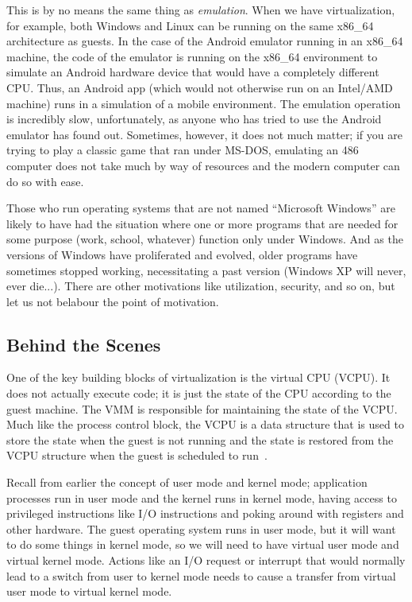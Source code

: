 This is by no means the same thing as \textit{emulation}. When we have virtualization, for example, both Windows and Linux can be running on the same x86\_64 architecture as guests. In the case of the Android emulator running in an x86\_64 machine, the code of the emulator is running on the x86\_64 environment to simulate an Android hardware device that would have a completely different CPU. Thus, an Android app (which would not otherwise run on an Intel/AMD machine) runs in a simulation of a mobile environment. The emulation operation is incredibly slow, unfortunately, as anyone who has tried to use the Android emulator has found out. Sometimes, however, it does not much matter; if you are trying to play a classic game that ran under MS-DOS, emulating an 486 computer does not take much by way of resources and the modern computer can do so with ease.

Those who run operating systems that are not named ``Microsoft Windows'' are likely to have had the situation where one or more programs that are needed for some purpose (work, school, whatever) function only under Windows. And as the versions of Windows have proliferated and evolved, older programs have sometimes stopped working, necessitating a past version (Windows XP will never, ever die...). There are other motivations like utilization, security, and so on, but let us not belabour the point of motivation.

\subsection*{Behind the Scenes}

One of the key building blocks of virtualization is the virtual CPU (VCPU). It does not actually execute code; it is just the state of the CPU according to the guest machine. The VMM is responsible for maintaining the state of the VCPU. Much like the process control block, the VCPU is a data structure that is used to store the state when the guest is not running and the state is restored from the VCPU structure when the guest is scheduled to run~\cite{osc}.

Recall from earlier the concept of user mode and kernel mode; application processes run in user mode and the kernel runs in kernel mode, having access to privileged instructions like I/O instructions and poking around with registers and other hardware. The guest operating system runs in user mode, but it will want to do some things in kernel mode, so we will need to have virtual user mode and virtual kernel mode. Actions like an I/O request or interrupt that would normally lead to a switch from user to kernel mode needs to cause a transfer from virtual user mode to virtual kernel mode.

